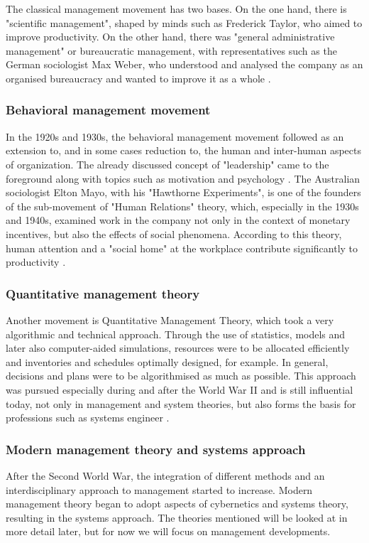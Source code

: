 \documentclass[a4paper,12pt]{article}
\begin{document}
The classical management movement has two bases. On the one hand, there is
"scientific management", shaped by minds such as Frederick Taylor, who aimed
to improve productivity. On the other hand, there was "general administrative
management" or bureaucratic management, with representatives such as the
German sociologist Max Weber, who understood and analysed the company as an
organised bureaucracy and wanted to improve it as a whole
\cite{oelsnitz:2009}.

\subsubsection{Behavioral management movement}
In the 1920s and 1930s, the behavioral management movement followed as an
extension to, and in some cases reduction to, the human and inter-human
aspects of organization. The already discussed concept of "leadership" came to
the foreground along with topics such as motivation and psychology
\cite{pindur:1995}. The Australian sociologist Elton Mayo, with his "Hawthorne
Experiments", is one of the founders of the sub-movement of "Human Relations"
theory, which, especially in the 1930s and 1940s, examined work in the company
not only in the context of monetary incentives, but also the effects of social
phenomena. According to this theory, human attention and a "social home" at
the workplace contribute significantly to productivity \cite{oelsnitz:2009}.

\subsubsection{Quantitative management theory}
Another movement is Quantitative Management Theory, which took a very
algorithmic and technical approach. Through the use of statistics, models and
later also computer-aided simulations, resources were to be allocated
efficiently and inventories and schedules optimally designed, for example. In
general, decisions and plans were to be algorithmised as much as possible.
This approach was pursued especially during and after the World War II and is
still influential today, not only in management and system theories, but also
forms the basis for professions such as systems engineer \cite{hossain:2019}.

\subsubsection{Modern management theory and systems approach}
After the Second World War, the integration of different methods and an
interdisciplinary approach to management started to increase. Modern
management theory began to adopt aspects of cybernetics and systems theory,
resulting in the systems approach. The theories mentioned will be looked at in
more detail later, but for now we will focus on management developments.
\end{document}
